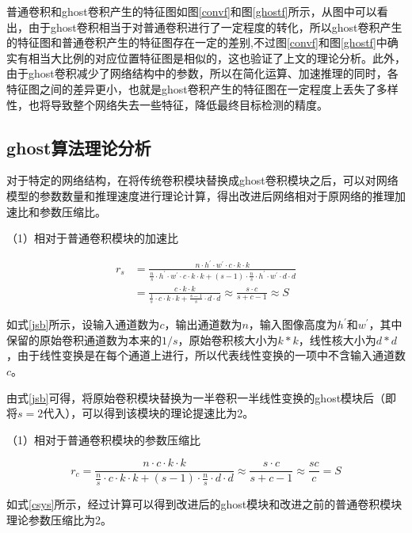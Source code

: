 普通卷积和ghost卷积产生的特征图如图\ref{convf}和图\ref{ghostf}所示，从图中可以看出，由于ghost卷积相当于对普通卷积进行了一定程度的转化，所以ghost卷积产生的特征图和普通卷积产生的特征图存在一定的差别,不过图\ref{convf}和图\ref{ghostf}中确实有相当大比例的对应位置特征图是相似的，这也验证了上文的理论分析。此外，由于ghost卷积减少了网络结构中的参数，所以在简化运算、加速推理的同时，各特征图之间的差异更小，也就是ghost卷积产生的特征图在一定程度上丢失了多样性，也将导致整个网络失去一些特征，降低最终目标检测的精度。

\subsection{ghost算法理论分析}
对于特定的网络结构，在将传统卷积模块替换成ghost卷积模块之后，可以对网络模型的参数数量和推理速度进行理论计算，得出改进后网络相对于原网络的推理加速比和参数压缩比。

（1）相对于普通卷积模块的加速比

\begin{equation}
    \begin{aligned}
    r_{s} &=\frac{n \cdot h^{\prime} \cdot w^{\prime} \cdot c \cdot k \cdot k}{\frac{n}{s} \cdot h^{\prime} \cdot w^{\prime} \cdot c \cdot k \cdot k+(s-1) \cdot \frac{n}{s} \cdot h^{\prime} \cdot w^{\prime} \cdot d \cdot d} \\
    &=\frac{c \cdot k \cdot k}{\frac{1}{s} \cdot c \cdot k \cdot k+\frac{s-1}{s} \cdot d \cdot d} \approx \frac{s \cdot c}{s+c-1} \approx S
    \end{aligned}
    \label{jsb}
\end{equation}

如式\ref{jsb}所示，设输入通道数为$c$，输出通道数为$n$，输入图像高度为$h^{\prime}$和$w^{\prime}$，其中保留的原始卷积通道数为本来的$1/s$，原始卷积核大小为$k*k$，线性核大小为$d*d$，由于线性变换是在每个通道上进行，所以代表线性变换的一项中不含输入通道数$c$。

由式\ref{jsb}可得，将原始卷积模块替换为一半卷积一半线性变换的ghost模块后（即将$s=2$代入），可以得到该模块的理论提速比为2。

（1）相对于普通卷积模块的参数压缩比

\begin{equation}
    r_{c}=\frac{n \cdot c \cdot k \cdot k}{\frac{n}{s} \cdot c \cdot k \cdot k+(s-1) \cdot \frac{n}{s} \cdot d \cdot d} \approx \frac{s \cdot c}{s+c-1} \approx \frac{s c}{c}=S
    \label{csys}
\end{equation}

如式\ref{csys}所示，经过计算可以得到改进后的ghost模块和改进之前的普通卷积模块理论参数压缩比为2。

